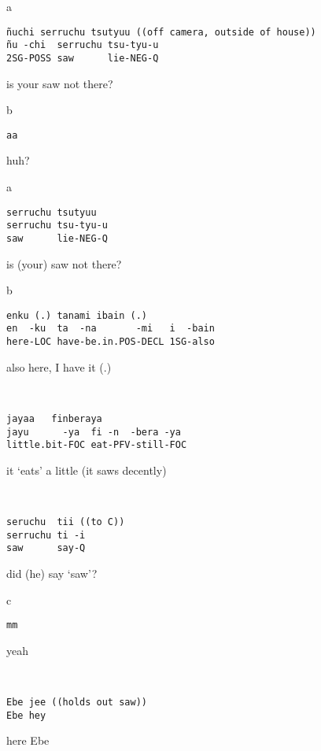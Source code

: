 \documentclass[output=paper]{langsci/langscibook}
\begin{document}
\vspace{-1mm}
%
\begin{mdframednoverticalspace}[style=firstfoc]
\begin{transbox}{1}{a}
\begin{verbatim}
ñuchi serruchu tsutyuu ((off camera, outside of house))
ñu -chi  serruchu tsu-tyu-u
2SG-POSS saw      lie-NEG-Q
\end{verbatim}
is your saw not there?
\end{transbox}
\end{mdframednoverticalspace}
%
\begin{transbox}{2}{b}
\begin{verbatim}
aa
\end{verbatim}
huh?
\end{transbox}
%
\begin{transbox}{3}{a}
\begin{verbatim}
serruchu tsutyuu
serruchu tsu-tyu-u
saw      lie-NEG-Q
\end{verbatim}
is (your) saw not there?
\end{transbox}
%
\begin{transbox}{4}{b}
\begin{verbatim}
enku (.) tanami ibain (.)
en  -ku  ta  -na       -mi   i  -bain
here-LOC have-be.in.POS-DECL 1SG-also
\end{verbatim}
also here, I have it (.)
\end{transbox}
%
\begin{transbox}{5}{~}
\begin{verbatim}
jayaa   finberaya
jayu      -ya  fi -n  -bera -ya
little.bit-FOC eat-PFV-still-FOC
\end{verbatim}
it ‘eats’ a little (it saws decently)
\end{transbox}
%
\begin{transbox}{6}{~}
\begin{verbatim}
seruchu  tii ((to C))
serruchu ti -i
saw      say-Q
\end{verbatim}
did (he) say ‘saw’?
\end{transbox}
%
\begin{transbox}{7}{c}
\begin{verbatim}
mm
\end{verbatim}
yeah
\end{transbox}
%
\vspace{-2mm}
%
\begin{mdframednoverticalspace}[style=secondfoc]
\begin{transbox}{9}{~}
\begin{verbatim}
Ebe jee ((holds out saw))
Ebe hey
\end{verbatim}
here Ebe
\end{transbox}
\end{mdframednoverticalspace}\bigskip
\end{document}
